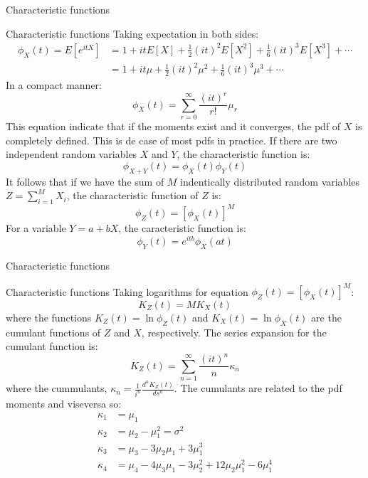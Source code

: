 \documentclass[8pt]{beamer}
\renewcommand{\emph}[1]{\textcolor{myorange}{#1}}
\begin{document}
\begin{frame}{Characteristic functions}
    \begin{block}{Characteristic functions}
        Taking expectation in both sides:
        \begin{align*}
            \phi_X (t) = E[e^{itX}] &= 1 + itE[X] + \frac{1}{2} (it)^2 E[X^2] + \frac{1}{6} (it)^3 E[X^3] + \cdots  \\
                                    &= 1 + it\mu + \frac{1}{2} (it)^2 \mu^2 + \frac{1}{6} (it)^3 \mu^3 + \cdots  
        \end{align*}
    In a compact manner:
    \[
        \phi_X (t) = \sum_{r=0}^{\infty} \frac{(it)^r}{r!} \mu_r
\]
This equation indicate that if the moments exist and it converges, the \emph{pdf} of $X$ is completely defined. This is de case of most \emph{pdf}s in practice. 
If there are two independent random variables $X$ and $Y$, the \emph{characteristic function} is:
    \[
        \phi_{X + Y} (t) = \phi_X (t) \phi_Y (t) 
\]
It follows that if we have the sum of $M$ indentically distributed random variables $Z = \sum_{i=1}^{M} X_i$, the \emph{characteristic function} of $Z$ is:
    \[
        \phi_Z (t) = \left[ \phi_X (t) \right]^M
\]
For a variable $Y = a + bX$, the \emph{caracteristic function} is:
    \[
        \phi_Y (t) = e^{itb} \phi_X (at)
\]
    \end{block}
\end{frame}

\begin{frame}{Characteristic functions}
    \begin{block}{Characteristic functions}
    Taking logarithms for equation $\phi_Z (t) = \left[ \phi_X (t) \right]^M $:
    \[
        K_Z (t) = M K_X (t)
\]
where the functions $K_Z (t) = \ln \phi_Z (t)$ and $K_X (t) = \ln \phi_X (t)$ are the \alert{cumulant functions} of $Z$ and $X$, respectively. The series expansion for the \emph{cumulant function} is: 
    \[
        K_Z (t) = \sum_{n=1}^{\infty} \frac{(it)^n}{n} \kappa_n
\]
where the \alert{cummulants},  $\kappa_n = \frac{1}{i^n} \frac{d^n K_Z (t)}{ds^n}$. The \emph{cumulants} are related to the pdf  moments and viseversa so:
\begin{align*}
    \kappa_1 &= \mu_1 \\
    \kappa_2 &= \mu_2 - \mu_1^2 = \sigma^2 \\
    \kappa_3 &= \mu_3 - 3\mu_2 \mu_1 + 3\mu_1^3 \\
    \kappa_4 &= \mu_4 - 4 \mu_3 \mu_1 - 3\mu_2^2 + 12 \mu_2 \mu_1^2 - 6 \mu_1^4
\end{align*}
    \end{block}
\end{frame}
\end{document}
